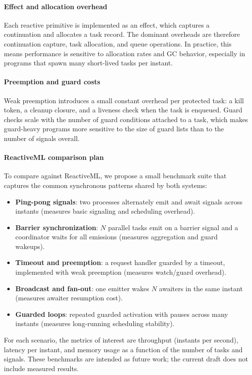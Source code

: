\paragraph{Effect and allocation overhead}
Each reactive primitive is implemented as an effect, which captures a
continuation and allocates a task record. The dominant overheads are therefore
continuation capture, task allocation, and queue operations. In practice, this
means performance is sensitive to allocation rates and GC behavior, especially
in programs that spawn many short-lived tasks per instant.

\paragraph{Preemption and guard costs}
Weak preemption introduces a small constant overhead per protected task: a kill
token, a cleanup closure, and a liveness check when the task is enqueued. Guard
checks scale with the number of guard conditions attached to a task, which
makes guard-heavy programs more sensitive to the size of guard lists than to
the number of signals overall.

\paragraph{ReactiveML comparison plan}
To compare \tempo{} against ReactiveML, we propose a small benchmark suite that
captures the common synchronous patterns shared by both systems:
\begin{itemize}
\item \textbf{Ping-pong signals}: two processes alternately emit and await
  signals across instants (measures basic signaling and scheduling overhead).
\item \textbf{Barrier synchronization}: $N$ parallel tasks emit on a barrier
  signal and a coordinator waits for all emissions (measures aggregation and
  guard wakeups).
\item \textbf{Timeout and preemption}: a request handler guarded by a timeout,
  implemented with weak preemption (measures watch/guard overhead).
\item \textbf{Broadcast and fan-out}: one emitter wakes $N$ awaiters in the same
  instant (measures awaiter resumption cost).
\item \textbf{Guarded loops}: repeated guarded activation with pauses across
  many instants (measures long-running scheduling stability).
\end{itemize}
For each scenario, the metrics of interest are throughput (instants per second),
latency per instant, and memory usage as a function of the number of tasks and
signals. These benchmarks are intended as future work; the current draft does
not include measured results.

